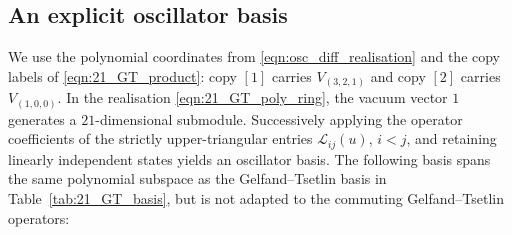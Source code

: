 \documentclass[12pt,reqno]{amsart}
\numberwithin{equation}{section}
\begin{document}
	\subsection{An explicit oscillator basis}
	\label{app:21_oscillator_basis}
	We use the polynomial coordinates from \eqref{eqn:osc_diff_realisation}
	and the copy labels of \eqref{eqn:21_GT_product}: copy $[1]$ carries
	$V_{(3,2,1)}$ and copy $[2]$ carries $V_{(1,0,0)}$.
	In the realisation \eqref{eqn:21_GT_poly_ring}, the vacuum vector $1$
	generates a $21$-dimensional submodule. Successively applying the operator
	coefficients of the strictly upper-triangular entries $\mathcal{L}_{ij}(u)$,
	$i<j$, and retaining linearly independent states yields an oscillator basis.
	The following basis spans the same polynomial subspace as the
	Gelfand--Tsetlin basis in Table~\ref{tab:21_GT_basis}, but is not adapted
	to the commuting Gelfand--Tsetlin operators:
	\begingroup
	\setlength{\extrarowheight}{2pt}
\end{document}
